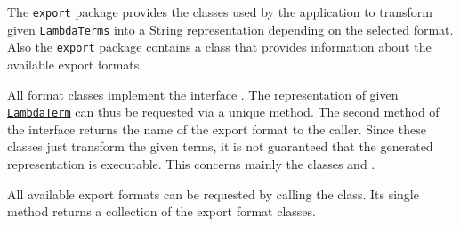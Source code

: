 The \texttt{export} package provides the classes used by the application to transform given \texttt{\hyperref[type:edu.kit.wavelength.client.model.term.LambdaTerm]{LambdaTerms}} into a String representation depending on the selected format. Also the \texttt{export} package contains a \texttt{} class that provides information about the available export formats. 

All format classes implement the interface \texttt{}. The representation of given \texttt{\hyperref[type:edu.kit.wavelength.client.model.term.LambdaTerm]{LambdaTerm}} can thus be requested via a unique method. 
The second method of the interface returns the name of the export format to the caller.
Since these classes just transform the given terms, it is not guaranteed that the generated representation is executable. This concerns mainly the classes \texttt{} and \texttt{}.

All available export formats can be requested by calling the \texttt{} class. Its single method returns a collection of the export format classes.  
